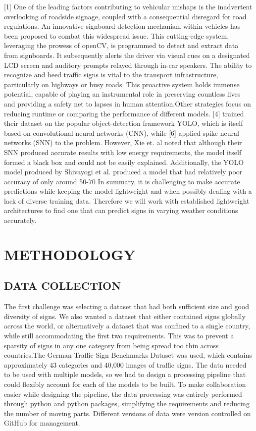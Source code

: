 \documentclass[conference]{IEEEtran}
\begin{document}
[1] One of the leading factors contributing to vehicular mishaps is the inadvertent overlooking of roadside signage, coupled with a consequential disregard for road regulations. An innovative signboard detection mechanism within vehicles has been proposed to combat this widespread issue. This cutting-edge system, leveraging the prowess of openCV, is programmed to detect and extract data from signboards. It subsequently alerts the driver via visual cues on a designated LCD screen and auditory prompts relayed through in-car speakers. The ability to recognize and heed traffic signs is vital to the transport infrastructure, particularly on highways or busy roads. This proactive system holds immense potential, capable of playing an instrumental role in preserving countless lives and providing a safety net to lapses in human attention.Other strategies focus on reducing runtime or comparing the performance of different models. [4] trained their dataset on the popular object-detection framework YOLO, which is itself based on convolutional neural networks (CNN), while [6] applied spike neural networks (SNN) to the problem. However, Xie et. al noted that although their SNN produced accurate results with low energy requirements, the model itself formed a black box and could not be easily explained. Additionally, the YOLO model produced by Shivayogi et al. produced a model that had relatively poor accuracy of only around 50-70%
In summary, it is challenging to make accurate predictions while keeping the model lightweight and when possibly dealing with a lack of diverse training data. Therefore we will work with established lightweight architectures to find one that can predict signs in varying weather conditions accurately.


\section{METHODOLOGY}
\subsection{DATA COLLECTION}
The first challenge was selecting a dataset that had both sufficient size and good diversity of signs. We also wanted a dataset that either contained signs globally across the world, or alternatively a dataset that was confined to a single country, while still accommodating the first two requirements. This was to prevent a sparsity of signs in any one category from being spread too thin across countries.The German Traffic Sign Benchmarks Dataset was used, which contains approximately 43 categories and 40,000 images of traffic signs. 
The data needed to be used with multiple models, so we had to design a processing pipeline that could flexibly account for each of the models to be built. To make collaboration easier while designing the pipeline, the data processing was entirely performed through python and python packages, simplifying the requirements and reducing the number of moving parts. Different versions of data were version controlled on GitHub for management.
\end{document}

